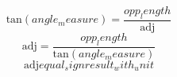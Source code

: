 \[\text{{tan}}({angle_measure})=\frac{{{opp_length}}}{{\text{{{adj}}}}}\]
\[\text{{{adj}}}=\frac{{{opp_length}}}{{\text{{tan}}({angle_measure})}}\]
\[\text{{{adj}}}{equal_sign}{result_with_unit}\]
